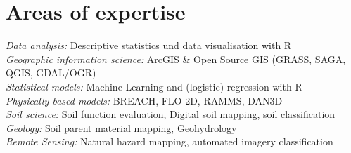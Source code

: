 \documentclass[a4paper]{twentysecondcv} %
\begin{document}

\aboutme{} %







\makeprofile %




\section{Areas of expertise}

\emph{Data analysis:} Descriptive statistics und data visualisation with R\\[0.3em]
\emph{Geographic information science:} ArcGIS \& Open Source GIS (GRASS, SAGA, \hspace*{14.5em} QGIS, GDAL/OGR)\\[0.3em]
\emph{Statistical models:} Machine Learning and (logistic) regression with R\\[0.3em]
\emph{Physically-based models:}         BREACH, FLO-2D, RAMMS, DAN3D\\[0.3em]
\emph{Soil science:} Soil function evaluation, Digital soil mapping, soil classification\\[0.3em]
\emph{Geology:} Soil parent material mapping, Geohydrology\\[0.3em]
\emph{Remote Sensing:} Natural hazard mapping, automated imagery classification \\[0.3em]
\end{document}
